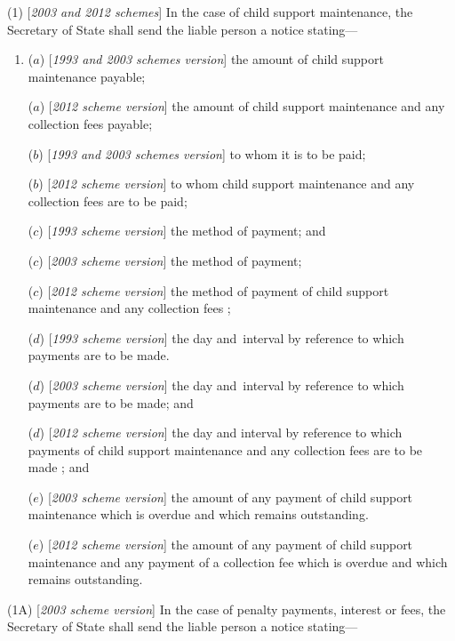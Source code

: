 \documentclass[12pt,a4paper]{article}
\begin{document}
(1) [\emph{2003 and 2012 schemes}]
In the case of child support maintenance,  %
the Secretary of State shall send the liable person a notice stating—
\begin{enumerate}\item[]
($a$) [\emph{1993 and 2003 schemes version}] the amount of child support maintenance payable;

($a$) [\emph{2012 scheme version}] the amount of child support maintenance 
and any collection fees  %
payable;

($b$) [\emph{1993 and 2003 schemes version}] to whom it is to be paid;

($b$) [\emph{2012 scheme version}] to whom 
child support maintenance and any collection fees are  %
to be paid;

($c$) [\emph{1993 scheme version}] the method of payment; and

($c$) [\emph{2003 scheme version}] the method of payment; 

($c$) [\emph{2012 scheme version}] the method of payment
of child support maintenance and any collection fees%
; 

($d$) [\emph{1993 scheme version}] the day and~interval by reference to which payments are to be made.

($d$) [\emph{2003 scheme version}] the day and~interval by reference to which payments are to be made; and

($d$) [\emph{2012 scheme version}] the day and interval by reference to which payments 
of child support maintenance and any collection fees  %
are to be made%
; and

($e$) [\emph{2003 scheme version}] the amount of any payment of child support maintenance which is overdue and which remains outstanding.

($e$) [\emph{2012 scheme version}] the amount of any payment of child support maintenance 
and any payment of a collection fee  %
which is overdue and which remains outstanding.
\end{enumerate}

(1A) [\emph{2003 scheme version}] In the case of penalty payments, interest or fees, the Secretary of State shall send the liable person a notice stating—
\end{document}
